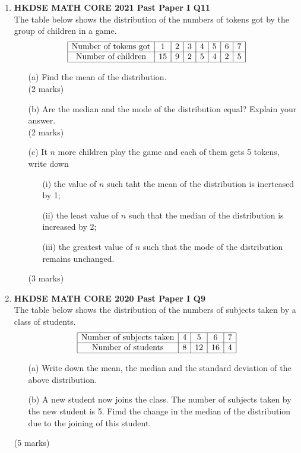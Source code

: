 \documentclass[12pt]{article}
\begin{document}
\begin{enumerate}
	\item \textbf{HKDSE MATH CORE 2021 Past Paper I Q11}\\
	The table below shows the distribution of the numbers of tokens got by the group of children in a game.
	$$\begin{array}{|c|c|c|c|c|c|c|c|}
		\hline
		\text{Number of tokens got} & 1 & 2 & 3 & 4 & 5 & 6 & 7 \\
		\hline
		\text{Number of children} & 15 & 9 & 2 & 5 & 4 & 2 & 5 \\
		\hline
	\end{array}$$
	\begin{enumerate}
		\item[(a)] Find the mean of the distribution. \\(2 marks)
		\item[(b)] Are the median and the mode of the distribution equal? Explain your answer. \\(2 marks)
		\item[(c)] It $n$ more children play the game and each of them gets 5 tokens, write down
		\begin{enumerate}
			\item[(i)] the value of $n$ such taht the mean of the distribution is incrteased by 1;
			\item[(ii)] the least value of $n$ such that the median of the distribution is increased by 2;
			\item[(iii)] the greatest value of $n$ such that the mode of the distribution remains unchanged.
		\end{enumerate}
		(3 marks)
	\end{enumerate}

	\item \textbf{HKDSE MATH CORE 2020 Past Paper I Q9}\\
	The table below shows the distribution of the numbers of subjects taken by a class of students.
	$$\begin{array}{|c|c|c|c|c|}
		\hline
		\text{Number of subjects taken} & 4 & 5 & 6 & 7 \\
		\hline
		\text{Number of students} & 8 & 12 & 16 & 4 \\
		\hline
	\end{array}$$
	\begin{enumerate}
		\item[(a)] Write down the mean, the median and the standard deviation of the above distribution.
		\item[(b)] A new student now joins the class. The number of subjects taken by the new student is 5. Fimd the change in the median of the distribution due to the joining of this student.
	\end{enumerate}
	(5 marks)


\end{enumerate}
\end{document}
